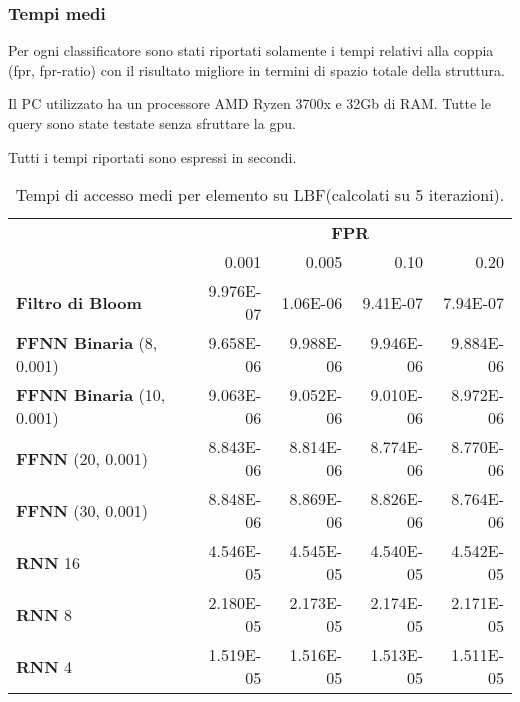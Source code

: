 \documentclass[4apaper,11pt]{report}
\begin{document}
    \subsubsection{Tempi medi}
    Per ogni classificatore sono stati riportati solamente i tempi relativi alla coppia (fpr, fpr-ratio) con il risultato migliore in termini di spazio totale della struttura.

    Il PC utilizzato ha un processore AMD Ryzen 3700x e 32Gb di RAM. Tutte le query sono state testate senza sfruttare la gpu.

    Tutti i tempi riportati sono espressi in secondi.

    \begin{table}[H]
        \centering
        \begin{tabular}{lrrrr}
            \toprule
            & \multicolumn{4}{c}{\textbf{FPR}}\\
            & 0.001 & 0.005 & 0.10 & 0.20\\        
            \midrule
            \textbf{Filtro di Bloom} & 9.976E-07 & 1.06E-06 & 9.41E-07 & 7.94E-07\\
            \midrule
            \textbf{FFNN Binaria} (8, 0.001) & 9.658E-06 & 9.988E-06 &  9.946E-06 & 9.884E-06\\
            \textbf{FFNN Binaria} (10, 0.001) & 9.063E-06 & 9.052E-06 &  9.010E-06 & 8.972E-06\\
            \textbf{FFNN} (20, 0.001) & 8.843E-06 & 8.814E-06 &  8.774E-06 & 8.770E-06\\
            \textbf{FFNN} (30, 0.001) & 8.848E-06 & 8.869E-06 &  8.826E-06 & 8.764E-06\\
            \textbf{RNN} 16 & 4.546E-05 & 4.545E-05 &  4.540E-05 & 4.542E-05\\
            \textbf{RNN} 8 &  2.180E-05 & 2.173E-05 &  2.174E-05 & 2.171E-05\\
            \textbf{RNN} 4 & 1.519E-05 & 1.516E-05 & 1.513E-05 & 1.511E-05\\
            \bottomrule
        \end{tabular}
        \caption{Tempi di accesso medi per elemento su LBF(calcolati su 5 iterazioni).}
    \end{table}
\end{document}
